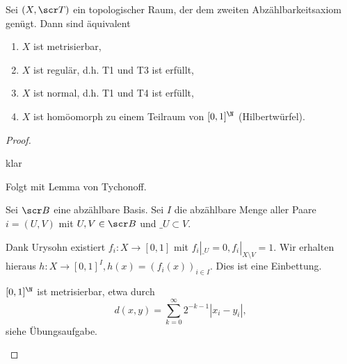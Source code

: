 \begin{st}
	Sei $(X, \scr T)$ ein topologischer Raum, der dem zweiten Abzählbarkeitsaxiom genügt.
	Dann sind äquivalent
	\begin{enumerate}[1)]
		\item
			$X$ ist metrisierbar,
		\item
			$X$ ist regulär, d.h. T1 und T3 ist erfüllt,
		\item
			$X$ ist normal, d.h. T1 und T4 ist erfüllt,
		\item
			$X$ ist homöomorph zu einem Teilraum von $[0,1]^\N$ (Hilbertwürfel).
	\end{enumerate}
	\begin{proof}
		\begin{segnb}[„(1)$\implies$(2)“]
			klar
		\end{segnb}
		\begin{segnb}[„(2)$\implies$(3)“]
			Folgt mit Lemma von Tychonoff. %
		\end{segnb}
		\begin{segnb}[„(3)$\implies$(4)“]
			Sei $\scr B$ eine abzählbare Basis.
			Sei $I$ die abzählbare Menge aller Paare $i = (U,V)$ mit $U,V \in \scr B$ und $\_U \subset V$.

			Dank Urysohn existiert $f_i: X \to [0,1]$ mit $f_i|_{\_U} = 0, f_i|_{X \setminus V} = 1$.
			Wir erhalten hieraus $h: X \to [0,1]^I, h(x) = (f_i(x))_{i \in I}$.
			Dies ist eine Einbettung.
		\end{segnb}
		\begin{segnb}[„(4)$\implies$(1)“]
			$[0,1]^\N$ ist metrisierbar, etwa durch
			\[
				d(x,y) = \sum_{k=0}^\infty 2^{-k-1} |x_i - y_i|,
			\]
			siehe Übungsaufgabe. %
		\end{segnb}
	\end{proof}
\end{st}
